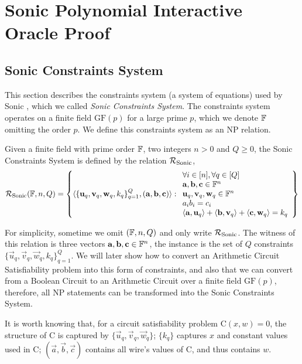 \chapter{Sonic Polynomial Interactive Oracle Proof}
\label{chap-sonic}

\section{Sonic Constraints System}

This section describes the constraints system (a system of equations) used by Sonic \cite{maller2019sonic}, which we called \textit{Sonic Constraints System}. The constraints system operates on a finite field $\mathrm{GF}(p)$ for a large prime $p$, which we denote $\mathbb{F}$ omitting the order $p$. We define this constraints system as an NP relation.

\begin{definition}
Given a finite field with prime order $\mathbb{F}$, two integers $n > 0$ and $Q \ge 0$, the Sonic Constraints System is defined by the relation $\mathcal{R}_{\mathrm{Sonic}}$,
\[
\mathcal{R}_{\mathrm{Sonic}}(\mathbb{F}, n, Q) = \left\{
\langle
    \{ \mathbf{u}_q, \mathbf{v}_q, \mathbf{w}_q, k_q \}_{q=1}^{Q},
    (\mathbf{a}, \mathbf{b}, \mathbf{c})
\rangle
:
\begin{array}{l}
    \forall i \in [n], \forall q \in [Q] \\
    \mathbf{a}, \mathbf{b}, \mathbf{c} \in \mathbb{F}^n \\
    \mathbf{u}_q, \mathbf{v}_q, \mathbf{w}_q \in \mathbb{F}^n \\
    a_i b_i = c_i \\
    \langle \mathbf{a}, \mathbf{u}_q \rangle
      + \langle \mathbf{b}, \mathbf{v}_q \rangle
      + \langle \mathbf{c}, \mathbf{w}_q \rangle
      = k_q
\end{array}
\right\}
\]
\end{definition}

For simplicity, sometime we omit $(\mathbb{F}, n, Q)$ and only write $\mathcal{R}_{\mathrm{Sonic}}$. The witness of this relation is three vectors $\mathbf{a}, \mathbf{b}, \mathbf{c} \in \mathbb{F}^n$, the instance is the set of $Q$ constraints $\{ \Vec{u}_q, \Vec{v}_q, \Vec{w}_q, k_q \}_{q=1}^{Q}$. We will later show how to convert an Arithmetic Circuit Satisfiability problem into this form of constraints, and also that we can convert from a Boolean Circuit to an Arithmetic Circuit  over a finite field $\mathrm{GF}(p)$, therefore, all NP statements can be transformed into the Sonic Constraints System.

It is worth knowing that, for a circuit satisfiability problem $\mathrm{C}(x, w) = 0$, the structure of $\mathrm{C}$ is captured by $\{ \Vec{u}_q, \Vec{v}_q, \Vec{w}_q \}$; $\{ k_q \}$ captures $x$ and constant values used in $\mathrm{C}$; $(\Vec{a}, \Vec{b}, \Vec{c})$ contains all wire's values of $\mathrm{C}$, and thus contains $w$.

